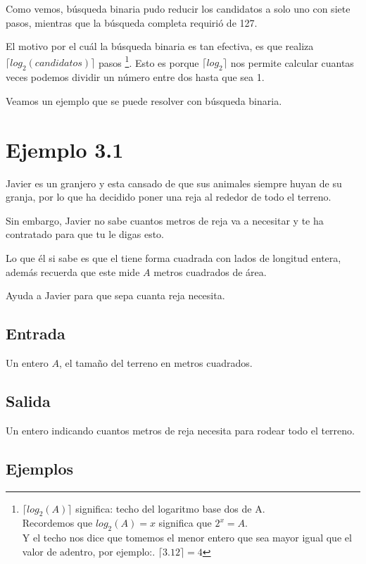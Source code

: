 Como vemos, búsqueda binaria pudo reducir los candidatos a solo uno con siete pasos, mientras que la búsqueda completa requirió de 127.

El motivo por el cuál la búsqueda binaria es tan efectiva, es que realiza \(\lceil log_2(candidatos) \rceil\) pasos \footnote{\(\lceil log_2(A) \rceil \) significa: techo del logaritmo base dos de A.\\ Recordemos que \(log_2(A)=x\) significa que \(2^x=A\).\\ Y el techo nos dice que tomemos el menor entero que sea mayor igual que el valor de adentro, por ejemplo:. \(\lceil 3.12 \rceil =4\)}. Esto es porque \(\lceil log_2 \rceil \) nos permite calcular cuantas veces podemos dividir un número entre dos hasta que sea 1.

Veamos un ejemplo que se puede resolver con búsqueda binaria.
\pagebreak
\section*{Ejemplo 3.1}

Javier es un granjero y esta cansado de que sus animales siempre huyan de su granja, por lo que ha decidido poner una reja al rededor de todo el terreno.

Sin embargo, Javier no sabe cuantos metros de reja va a necesitar y te ha contratado para que tu le digas esto. 

Lo que él si sabe es que el tiene forma cuadrada con lados de longitud entera, además recuerda que este mide \(A\) metros cuadrados de área.

Ayuda a Javier para que sepa cuanta reja necesita.

\subsection*{Entrada}
Un entero \(A\), el tamaño del terreno en metros cuadrados.
\subsection*{Salida}
Un entero indicando cuantos metros de reja necesita para rodear todo el terreno. 

\subsection*{Ejemplos}
\begin{casebox2}
\end{casebox2}

